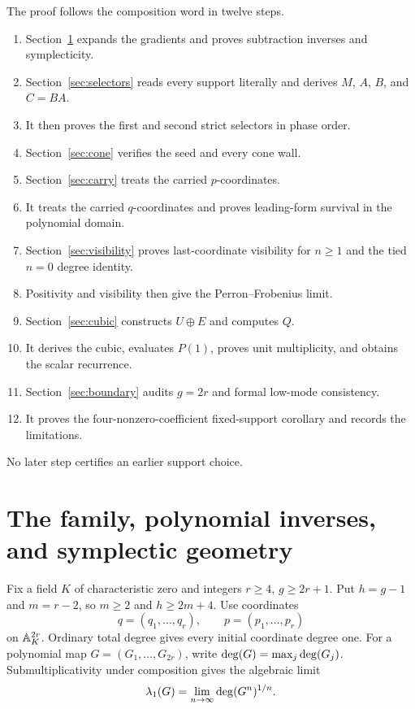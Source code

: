 \documentclass[11pt]{article}
\theoremstyle{remark}
\numberwithin{equation}{section}
\begin{document}
The proof follows the composition word in twelve steps.
\begin{enumerate}
\item Section~\ref{sec:family} expands the gradients and proves subtraction
inverses and symplecticity.
\item Section~\ref{sec:selectors} reads every support literally and derives
\(M\), \(A\), \(B\), and \(C=BA\).
\item It then proves the first and second strict selectors in phase order.
\item Section~\ref{sec:cone} verifies the seed and every cone wall.
\item Section~\ref{sec:carry} treats the carried \(p\)-coordinates.
\item It treats the carried \(q\)-coordinates and proves leading-form
survival in the polynomial domain.
\item Section~\ref{sec:visibility} proves last-coordinate visibility for
\(n\geq1\) and the tied \(n=0\) degree identity.
\item Positivity and visibility then give the Perron--Frobenius limit.
\item Section~\ref{sec:cubic} constructs \(U\oplus E\) and computes \(Q\).
\item It derives the cubic, evaluates \(P(1)\), proves unit multiplicity, and
obtains the scalar recurrence.
\item Section~\ref{sec:boundary} audits \(g=2r\) and formal low-mode
consistency.
\item It proves the four-nonzero-coefficient fixed-support corollary and
records the limitations.
\end{enumerate}
No later step certifies an earlier support choice.

\section{The family, polynomial inverses, and symplectic geometry}\label{sec:family}

Fix a field \(K\) of characteristic zero and integers \(r\geq4\),
\(g\geq2r+1\).  Put \(h=g-1\) and \(m=r-2\), so
\(m\geq2\) and \(h\geq2m+4\).  Use coordinates
\[
q=(q_1,\ldots,q_r),\qquad p=(p_1,\ldots,p_r)
\]
on \(\mathbb{A}_K^{2r}\).  Ordinary total degree gives every initial coordinate
degree one.  For a polynomial map \(G=(G_1,\ldots,G_{2r})\), write
\(\operatorname{deg}(G)=\max_j\operatorname{deg}(G_j)\).  Submultiplicativity under composition gives
the algebraic limit
\[
\lambda_1(G)=\lim_{n\to\infty}\operatorname{deg}(G^n)^{1/n}.
\]
\end{document}
